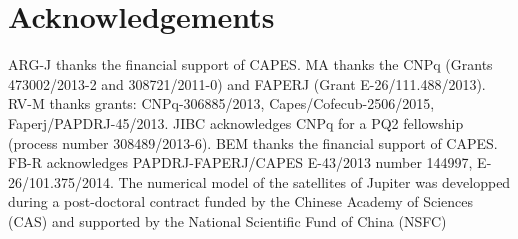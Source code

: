 \documentclass[useAMS,usenatbib]{mn2e}
\begin{document}
\section*{Acknowledgements}

ARG-J thanks the financial support of CAPES.
MA thanks the CNPq (Grants 473002/2013-2 and 308721/2011-0) and FAPERJ (Grant E-26/111.488/2013).
RV-M thanks grants: CNPq-306885/2013, Capes/Cofecub-2506/2015, Faperj/PAPDRJ-45/2013.
JIBC acknowledges CNPq for a PQ2 fellowship (process number 308489/2013-6).
BEM thanks the financial support of CAPES.
FB-R acknowledges PAPDRJ-FAPERJ/CAPES E-43/2013 number 144997, E-26/101.375/2014.
The numerical model of the satellites of Jupiter was developped during a post-doctoral contract funded by the Chinese Academy of Sciences (CAS) and supported by the National Scientific Fund of China (NSFC)






\label{lastpage}
\end{document}
